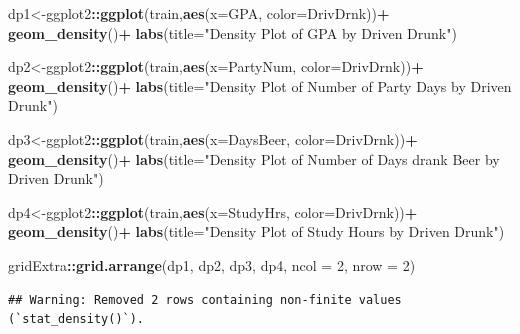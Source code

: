\documentclass[
]{book}
\newenvironment{Shaded}{\begin{snugshade}}{\end{snugshade}}
\newcommand{\AttributeTok}[1]{\textcolor[rgb]{0.13,0.29,0.53}{#1}}
\newcommand{\DecValTok}[1]{\textcolor[rgb]{0.00,0.00,0.81}{#1}}
\newcommand{\FunctionTok}[1]{\textcolor[rgb]{0.13,0.29,0.53}{\textbf{#1}}}
\newcommand{\NormalTok}[1]{#1}
\newcommand{\OtherTok}[1]{\textcolor[rgb]{0.56,0.35,0.01}{#1}}
\newcommand{\SpecialCharTok}[1]{\textcolor[rgb]{0.81,0.36,0.00}{\textbf{#1}}}
\newcommand{\StringTok}[1]{\textcolor[rgb]{0.31,0.60,0.02}{#1}}
\begin{document}
\begin{Shaded}
\begin{Highlighting}[]
\NormalTok{dp1}\OtherTok{\textless{}{-}}\NormalTok{ggplot2}\SpecialCharTok{::}\FunctionTok{ggplot}\NormalTok{(train,}\FunctionTok{aes}\NormalTok{(}\AttributeTok{x=}\NormalTok{GPA, }\AttributeTok{color=}\NormalTok{DrivDrnk))}\SpecialCharTok{+}
  \FunctionTok{geom\_density}\NormalTok{()}\SpecialCharTok{+}
  \FunctionTok{labs}\NormalTok{(}\AttributeTok{title=}\StringTok{"Density Plot of GPA by Driven Drunk"}\NormalTok{)}

\NormalTok{dp2}\OtherTok{\textless{}{-}}\NormalTok{ggplot2}\SpecialCharTok{::}\FunctionTok{ggplot}\NormalTok{(train,}\FunctionTok{aes}\NormalTok{(}\AttributeTok{x=}\NormalTok{PartyNum, }\AttributeTok{color=}\NormalTok{DrivDrnk))}\SpecialCharTok{+}
  \FunctionTok{geom\_density}\NormalTok{()}\SpecialCharTok{+}
  \FunctionTok{labs}\NormalTok{(}\AttributeTok{title=}\StringTok{"Density Plot of Number of Party Days by Driven Drunk"}\NormalTok{)}

\NormalTok{dp3}\OtherTok{\textless{}{-}}\NormalTok{ggplot2}\SpecialCharTok{::}\FunctionTok{ggplot}\NormalTok{(train,}\FunctionTok{aes}\NormalTok{(}\AttributeTok{x=}\NormalTok{DaysBeer, }\AttributeTok{color=}\NormalTok{DrivDrnk))}\SpecialCharTok{+}
  \FunctionTok{geom\_density}\NormalTok{()}\SpecialCharTok{+}
  \FunctionTok{labs}\NormalTok{(}\AttributeTok{title=}\StringTok{"Density Plot of Number of Days drank Beer by Driven Drunk"}\NormalTok{)}

\NormalTok{dp4}\OtherTok{\textless{}{-}}\NormalTok{ggplot2}\SpecialCharTok{::}\FunctionTok{ggplot}\NormalTok{(train,}\FunctionTok{aes}\NormalTok{(}\AttributeTok{x=}\NormalTok{StudyHrs, }\AttributeTok{color=}\NormalTok{DrivDrnk))}\SpecialCharTok{+}
  \FunctionTok{geom\_density}\NormalTok{()}\SpecialCharTok{+}
  \FunctionTok{labs}\NormalTok{(}\AttributeTok{title=}\StringTok{"Density Plot of Study Hours by Driven Drunk"}\NormalTok{)}

\NormalTok{gridExtra}\SpecialCharTok{::}\FunctionTok{grid.arrange}\NormalTok{(dp1, dp2, dp3, dp4, }\AttributeTok{ncol =} \DecValTok{2}\NormalTok{, }\AttributeTok{nrow =} \DecValTok{2}\NormalTok{)}
\end{Highlighting}
\end{Shaded}

\begin{verbatim}
## Warning: Removed 2 rows containing non-finite values (`stat_density()`).
\end{verbatim}
\end{document}
